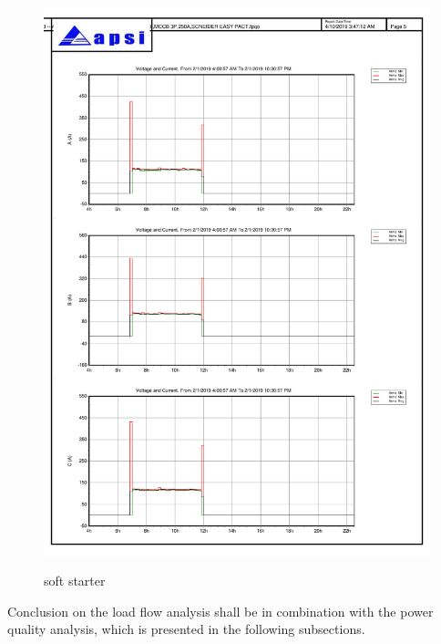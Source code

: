 \begin{figure}
	\includegraphics[width=\textwidth]{figures/fig_ch04_elecaudit_load_flow_softstarter.pdf} \\
	\caption{soft starter}
	\label{fig_ch04_elecaudit_load_flow_softstarter} 
\end{figure}

Conclusion on the load flow analysis shall be in combination with the power quality analysis, which is presented in the following subsections.

